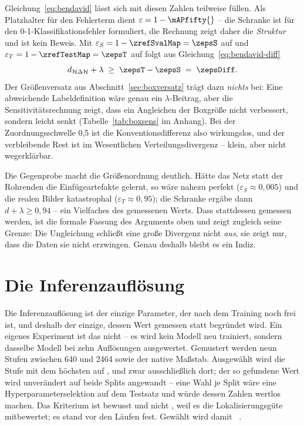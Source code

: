  Gleichung~\eqref{eq:bendavid} lässt
sich mit diesen Zahlen teilweise füllen. Als Platzhalter für den Fehlerterm dient
$\varepsilon = 1 - \mAPfifty{}$ -- die Schranke ist für den
0-1-Klassifikationsfehler formuliert, die Rechnung zeigt daher die
\emph{Struktur} und ist kein Beweis. Mit $\varepsilon_S = 1 - \zrefSvalMap = \zepsS$
auf  und $\varepsilon_T = 1 - \zrefTestMap = \zepsT$ auf 
folgt aus Gleichung~\eqref{eq:bendavid-diff}
\[
d_{\mathcal{H}\Delta\mathcal{H}} + \lambda \;\geq\; \zepsT - \zepsS
\;=\; \zepsDiff .
\]
Der Größenversatz aus Abschnitt~\ref{sec:boxversatz} trägt dazu \emph{nichts}
bei: Eine abweichende Labeldefinition wäre genau ein $\lambda$-Beitrag, aber die
Sensitivitätsrechnung zeigt, dass ein Angleichen der Boxgröße \mAPfifty{} nicht
verbessert, sondern leicht senkt (Tabelle~\ref{tab:boxsens} im Anhang). Bei der
Zuordnungsschwelle 0,5 ist die Konventionsdifferenz also wirkungslos, und der
verbleibende Rest ist im Wesentlichen Verteilungsdivergenz -- klein, aber nicht
wegerklärbar.

Die Gegenprobe macht die Größenordnung deutlich. Hätte das Netz statt der
Rohrenden die Einfügeartefakte gelernt, so wäre  nahezu perfekt
($\varepsilon_S \approx 0{,}005$) und die realen Bilder katastrophal
($\varepsilon_T \approx 0{,}95$); die Schranke ergäbe dann
$d + \lambda \geq 0{,}94$ -- ein Vielfaches des gemessenen Werts. Dass
stattdessen \zepsDiff{} gemessen werden, ist die formale Fassung des Arguments
oben und zeigt zugleich seine Grenze: Die Ungleichung schließt eine große
Divergenz nicht \emph{aus}, sie zeigt nur, dass die Daten sie nicht erzwingen.
Genau deshalb bleibt es ein Indiz.

\section{Die Inferenzauflösung}
\label{sec:imgsz}

Die Inferenzauflösung ist der einzige Parameter, der nach dem Training noch frei
ist, und deshalb der einzige, dessen Wert gemessen statt begründet wird. Ein
eigenes Experiment ist das nicht -- es wird kein Modell neu trainiert, sondern
dasselbe Modell bei zehn Auflösungen ausgewertet. Gemustert werden neun Stufen
zwischen 640 und 2464\px{} sowie der native Maßstab. Ausgewählt wird die Stufe
mit dem höchsten \mAPall{} auf , und zwar ausschließlich dort; der so
gefundene Wert wird unverändert auf beide Splits angewandt -- eine Wahl je Split
wäre eine Hyperparameterselektion auf dem Testsatz und würde dessen Zahlen
wertlos machen. Das Kriterium ist bewusst \mAPall{} und nicht \mAPfifty{}, weil
es die Lokalisierungsgüte mitbewertet; es stand vor den Läufen fest. Gewählt
wird damit ~\zbestImgsz.

